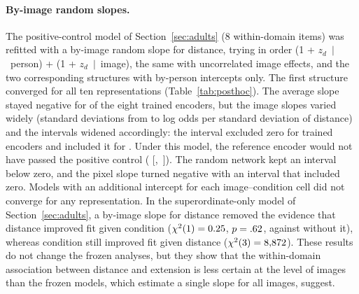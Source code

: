 \paragraph{By-image random slopes.} The positive-control model of Section~\ref{sec:adults} (8 within-domain items) was refitted with a by-image random slope for distance, trying in order (1 + $z_d$~$\mid$~person) + (1 + $z_d$~$\mid$~image), the same with uncorrelated image effects, and the two corresponding structures with by-person intercepts only. The first structure converged for all ten representations (Table~\ref{tab:posthoc}). The average slope stayed negative for \VcImgTrSameSignWord{} of the eight trained encoders, but the image slopes varied widely (standard deviations from \VcImgSdMin{} to \VcImgSdMax{} log odds per standard deviation of distance) and the intervals widened accordingly: the interval excluded zero for \VcImgTrExclWord{} trained encoders and included it for \VcImgTrInclList. Under this model, the reference encoder would not have passed the positive control (\VcImgRzB{} [\VcImgRzLo,~\VcImgRzHi]). The random network kept an interval below zero, and the pixel slope turned negative with an interval that included zero. Models with an additional intercept for each image--condition cell did not converge for any representation. In the superordinate-only model of Section~\ref{sec:adults}, a by-image slope for distance removed the evidence that distance improved fit given condition ($\chi^2(1) = 0.25$, $p = .62$, against \VcSupFrozenDistChi{} without it), whereas condition still improved fit given distance ($\chi^2(3) = 8{,}872$). These results do not change the frozen analyses, but they show that the within-domain association between distance and extension is less certain at the level of images than the frozen models, which estimate a single slope for all images, suggest.

